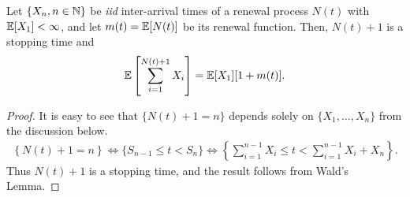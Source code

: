 \documentclass[a4paper,10pt, english]{article}
\begin{document}
\begin{prop} \label{prop:WaldRenewal}
	Let $\{X_n, n \in \mathbb{N}\}$ be \textit{iid} inter-arrival times of a renewal process $N(t)$ with $\mathbb{E}[X_1] < \infty$, and let $m(t) = \mathbb{E}[N(t)]$ be its renewal function. Then, $N(t)+1$ is a stopping time and 
	\begin{align*}
	\mathbb{E}\left[\sum_{i=1}^{N(t)+1}X_i\right] = \mathbb{E}[X_1][1+m(t)].
	\end{align*}
\end{prop}
\begin{proof} It is easy to see that $\{N(t)+1=n\}$ depends solely on $\{X_1,\ldots,X_n\}$ from the discussion below.
	\begin{align*}
	\left\{N(t) + 1 = n \right\} \iff \{S_{n-1} \leq t < S_n\} \iff \left\{\sum_{i=1}^{n-1} X_i \leq t < \sum_{i=1}^{n-1} X_i + X_n\right\}.
	\end{align*}
	Thus $N(t)+1$ is a stopping time, and the result follows from Wald's Lemma.
\end{proof}
\end{document}

